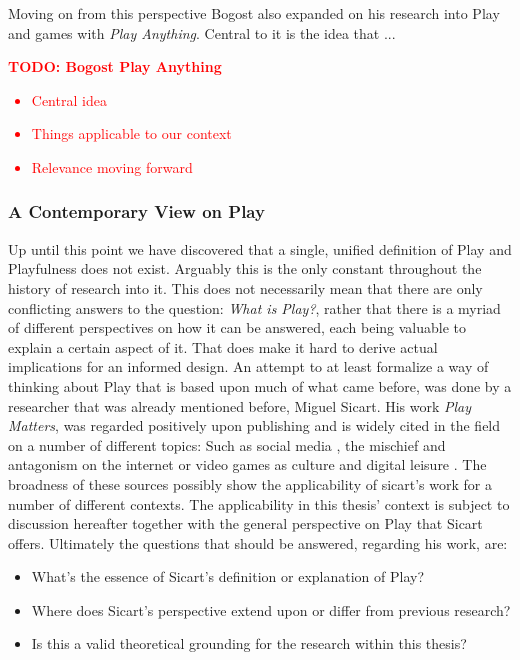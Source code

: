 Moving on from this perspective Bogost also expanded on his research into Play and games with \textit{Play Anything}. Central to it is the idea that ...

\textbf{\textcolor{red}{TODO: Bogost Play Anything}}
\textcolor{red}{
  \begin{itemize}
    \item Central idea
    \item Things applicable to our context
    \item Relevance moving forward
  \end{itemize}
}

\subsubsection{A Contemporary View on Play}

Up until this point we have discovered that a single, unified definition of Play and Playfulness does not exist. Arguably this is the only constant throughout the history of research into it. This does not necessarily mean that there are only conflicting answers to the question: \textit{What is Play?}, rather that there is a myriad of different perspectives on how it can be answered, each being valuable to explain a certain aspect of it. That does make it hard to derive actual implications for an informed design. An attempt to at least formalize a way of thinking about Play that is based upon much of what came before, was done by a researcher that was already mentioned before, Miguel Sicart. His work \textit{Play Matters}, was regarded positively upon publishing and is widely cited in the field on a number of different topics: Such as social media \cite{hjorth2019understanding}, the mischief and antagonism on the internet \cite{phillips2018ambivalent} or video games as culture \cite{daniel2018video} and digital leisure \cite{spracklen2015digital}. The broadness of these sources possibly show the applicability of sicart's work for a number of different contexts. The applicability in this thesis' context is subject to discussion hereafter together with the general perspective on Play that Sicart offers. Ultimately the questions that should be answered, regarding his work, are:

\begin{itemize}
  \item{What's the essence of Sicart's definition or explanation of Play?}
  \item{Where does Sicart's perspective extend upon or differ from previous research?}
  \item{Is this a valid theoretical grounding for the research within this thesis?}
\end{itemize}

